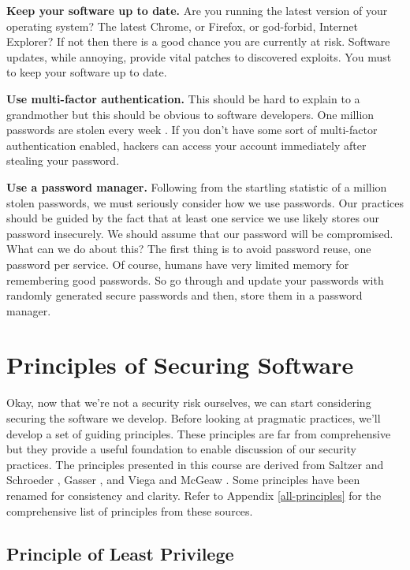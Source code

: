 \textbf{Keep your software up to date.}
Are you running the latest version of your operating system?
The latest Chrome, or Firefox, or god-forbid, Internet Explorer?
If not then there is a good chance you are currently at risk.
Software updates, while annoying, provide vital patches to discovered exploits.
You must to keep your software up to date.

\textbf{Use multi-factor authentication.}
This should be hard to explain to a grandmother but this should be obvious to software developers.
One million passwords are stolen every week \cite{password-security}.
If you don't have some sort of multi-factor authentication enabled, hackers can access your account immediately after stealing your password.

\textbf{Use a password manager.}
Following from the startling statistic of a million stolen passwords, we must seriously consider how we use passwords.
Our practices should be guided by the fact that at least one service we use likely stores our password insecurely.
We should assume that our password will be compromised.
What can we do about this?
The first thing is to avoid password reuse, one password per service.
Of course, humans have very limited memory for remembering good passwords.
So go through and update your passwords with randomly generated secure passwords and then, store them in a password manager.


\section{Principles of Securing Software}
Okay, now that we're not a security risk ourselves, we can start considering securing the software we develop.
Before looking at pragmatic practices, we'll develop a set of guiding principles.
These principles are far from comprehensive but they provide a useful foundation to enable discussion of our security practices.
The principles presented in this course are derived from Saltzer and Schroeder \cite{1975-security-design-principles},
Gasser \cite{1988-security-design-principles}, and Viega and McGeaw \cite{2001-security-design-principles}.
Some principles have been renamed for consistency and clarity.
Refer to Appendix \ref{all-principles} for the comprehensive list of principles from these sources. 

\subsection{Principle of Least Privilege}

